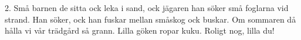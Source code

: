 2.  Små barnen de sitta ock leka i sand,
    ock jägaren han söker små foglarna vid strand.
    Han söker, ock han fuskar
    mellan småskog ock buskar.
    Om sommaren då hålla vi vår trädgård så grann.
    Lilla göken ropar kuku.
    Roligt nog, lilla du!
